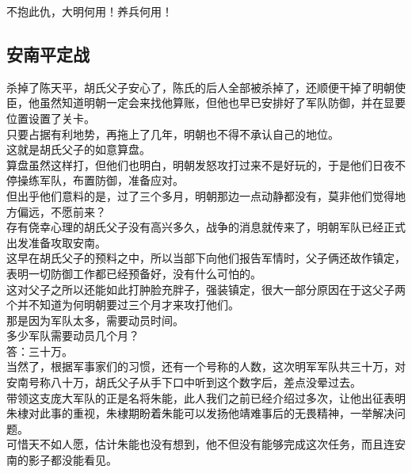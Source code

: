 \begin{multicols}{\theparacolNo}
不抱此仇，大明何用！养兵何用！\\

\subsection{安南平定战}
杀掉了陈天平，胡氏父子安心了，陈氏的后人全部被杀掉了，还顺便干掉了明朝使臣，他虽然知道明朝一定会来找他算账，但他也早已安排好了军队防御，并在显要位置设置了关卡。\\

只要占据有利地势，再拖上了几年，明朝也不得不承认自己的地位。\\

这就是胡氏父子的如意算盘。\\

算盘虽然这样打，但他们也明白，明朝发怒攻打过来不是好玩的，于是他们日夜不停操练军队，布置防御，准备应对。\\

但出乎他们意料的是，过了三个多月，明朝那边一点动静都没有，莫非他们觉得地方偏远，不愿前来？\\

存有侥幸心理的胡氏父子没有高兴多久，战争的消息就传来了，明朝军队已经正式出发准备攻取安南。\\

这早在胡氏父子的预料之中，所以当部下向他们报告军情时，父子俩还故作镇定，表明一切防御工作都已经预备好，没有什么可怕的。\\

这对父子之所以还能如此打肿脸充胖子，强装镇定，很大一部分原因在于这父子两个并不知道为何明朝要过三个月才来攻打他们。\\

那是因为军队太多，需要动员时间。\\

多少军队需要动员几个月？\\

答：三十万。\\

当然了，根据军事家们的习惯，还有一个号称的人数，这次明军军队共三十万，对安南号称八十万，胡氏父子从手下口中听到这个数字后，差点没晕过去。\\

带领这支庞大军队的正是名将朱能，此人我们之前已经介绍过多次，让他出征表明朱棣对此事的重视，朱棣期盼着朱能可以发扬他靖难事后的无畏精神，一举解决问题。\\

可惜天不如人愿，估计朱能也没有想到，他不但没有能够完成这次任务，而且连安南的影子都没能看见。\\


\end{multicols}
